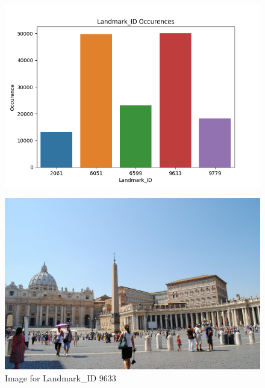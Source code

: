 \begin{figure}
	\includegraphics[width=\textwidth]{images/Landmark_ID_occurences}
	\label{landmark-ids}
\end{figure}
	
\begin{figure}
	\includegraphics[width=\textwidth]{images/9633}
	\caption{Image for Landmark\_ID 9633}
	\label{9633}
\end{figure}
	

